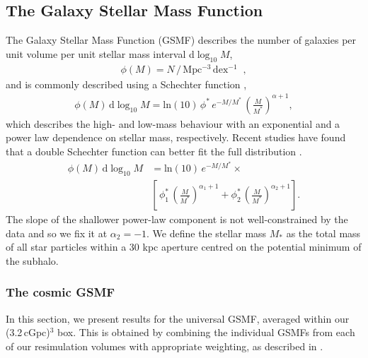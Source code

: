 \subsection{The Galaxy Stellar Mass Function}
\label{sec:results:gsmf}

The Galaxy Stellar Mass Function (GSMF) describes the number of galaxies per unit volume per unit stellar mass interval d$\log_{10}M$,
\begin{align}
    \phi(M) = N \,/\, \mathrm{Mpc^{-3} \, dex^{-1}}\;\;,
\end{align}
and is commonly described using a Schechter function \citep{schechter_analytic_1976},
\begin{align}
  \phi(M) \, \mathrm{d}\log_{10}M = \mathrm{ln}(10) \, \phi^* \, e^{-M/M^*} \, \left(\frac{M}{M^*} \right)^{\alpha + 1},
\end{align}
which describes the high- and low-mass behaviour with an exponential and a power law dependence on stellar mass, respectively.
Recent studies have found that a double Schechter function can better fit the full distribution \citep[\textit{e.g.} the GAMA survey, ][]{baldry_galaxy_2008}.
\begin{align}
    \phi(M) \, \mathrm{d}\log_{10}M& = \mathrm{ln}(10) \, e^{-M/M^*} \times \nonumber\\
    & \left[ \, \phi^{*}_{1} \, \left(\frac{M}{M^*} \right)^{\alpha_{1} + 1} + \phi^{*}_{2} \, \left( \frac{M}{M^*} \right)^{\alpha_{2} + 1} \right].
\end{align}
The slope of the shallower power-law component is not well-constrained by the data and so we fix it at $\alpha_2=-1$.
We define the stellar mass $M_{*}$ as the total mass of all star particles within a 30 kpc aperture centred on the potential minimum of the subhalo.

\subsubsection{The cosmic GSMF}
\label{sec:cos_gsmf}

In this section, we present results for the universal GSMF, averaged within our (3.2\,cGpc)$^3$ box.  This is obtained by combining the individual GSMFs from each of our resimulation volumes with appropriate weighting, as described in .


